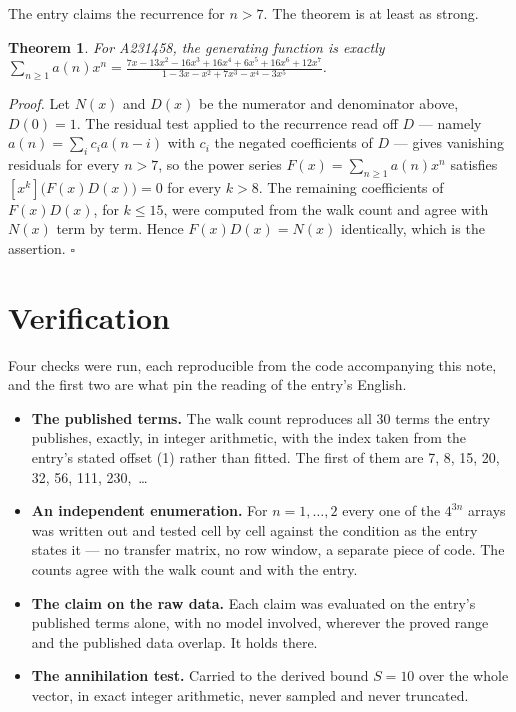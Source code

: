 \documentclass[11pt]{article}
\newtheorem{theorem}{Theorem}
\theoremstyle{definition}
\begin{document}
The entry claims the recurrence for $n > 7$. The theorem is at least as strong.

\begin{theorem} For A231458, the generating function is exactly $\sum_{n\ge 1} a(n)x^n = \frac{7x - 13x^{2} - 16x^{3} + 16x^{4} + 6x^{5} + 16x^{6} + 12x^{7}}{1 - 3x - x^{2} + 7x^{3} - x^{4} - 3x^{5}}$.\end{theorem}

{\itshape Proof.} Let $N(x)$ and $D(x)$ be the numerator and denominator above, $D(0)=1$. The residual test applied to the recurrence read off $D$ --- namely $a(n) = \sum_i c_i a(n-i)$ with $c_i$ the negated coefficients of $D$ --- gives vanishing residuals for every $n > 7$, so the power series $F(x)=\sum_{n\ge 1}a(n)x^n$ satisfies $[x^k]\bigl(F(x)D(x)\bigr) = 0$ for every $k > 8$. The remaining coefficients of $F(x)D(x)$, for $k \le 15$, were computed from the walk count and agree with $N(x)$ term by term. Hence $F(x)D(x) = N(x)$ identically, which is the assertion. $\square$

\section{Verification}

Four checks were run, each reproducible from the code accompanying this note, and the first two are what pin the reading of the entry's English.

\begin{itemize}

\item {\bfseries The published terms.} The walk count reproduces all 30 terms the entry publishes, exactly, in integer arithmetic, with the index taken from the entry's stated offset (1) rather than fitted. The first of them are 7, 8, 15, 20, 32, 56, 111, 230,~\dots

\item {\bfseries An independent enumeration.} For $n = 1,\dots,2$ every one of the $4^{3n}$ arrays was written out and tested cell by cell against the condition as the entry states it --- no transfer matrix, no row window, a separate piece of code. The counts agree with the walk count and with the entry.

\item {\bfseries The claim on the raw data.} Each claim was evaluated on the entry's published terms alone, with no model involved, wherever the proved range and the published data overlap. It holds there.

\item {\bfseries The annihilation test.} Carried to the derived bound $S = 10$ over the whole vector, in exact integer arithmetic, never sampled and never truncated.

\end{itemize}
\end{document}
